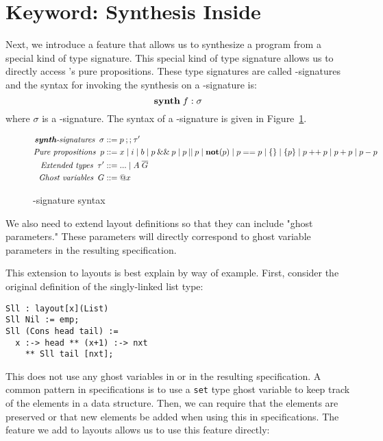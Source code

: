 \section{\synth{} Keyword: Synthesis Inside \Pika}
\label{sec:synth}

Next, we introduce a feature that allows us to synthesize a program from a special kind of \Pika{} type signature. This special kind of type signature allows us to directly access \SuSLik's pure propositions. These type signatures are called \synth-signatures and the syntax for invoking the \Pika{} synthesis on a \synth-signature is:
\[
  \textbf{synth}\; f : \sigma
\]
\noindent
where $\sigma$ is a \synth-signature. The syntax of a \synth-signature is given in Figure~\ref{fig:synth-sig-syntax}.

\begin{figure}
\[
\begin{aligned}
  \textit{\textbf{synth}-signatures}\;\; \sigma &::= p \mathbin{;;} \tau'\\
  \textit{Pure propositions}\;\; p &::= x \mid i \mid b \mid p \mathbin{\&\&} p \mid p \mathbin{||} p
    \mid \textbf{not}(p) \mid p == p \mid \{\} \mid \{p\} \mid p \mathbin{++} p \mid p + p \mid p - p\\
  \textit{Extended types}\;\; \tau' &::= ... \mid A\; \overline{G}\\
  \textit{Ghost variables}\;\; G &::= @x
\end{aligned}
\]
  \caption{\synth-signature syntax}
  \label{fig:synth-sig-syntax}
\end{figure}

\noindent
We also need to extend layout definitions so that they can include "ghost parameters." These parameters will directly correspond to ghost variable parameters in the resulting \SuSLik{} specification.

This extension to layouts is best explain by way of example. First, consider the original definition of the singly-linked list type:

\begin{lstlisting}
Sll : layout[x](List)
Sll Nil := emp;
Sll (Cons head tail) :=
  x :-> head ** (x+1) :-> nxt
    ** Sll tail [nxt];
\end{lstlisting}

\noindent
This does not use any ghost variables in \Pika{} or in the resulting \SuSLik{} specification. A common pattern in \SuSLik{} specifications is to use a \verb|set| type ghost variable to keep track of the elements in a data structure. Then, we can require that the elements are preserved or that new elements be added when using this in specifications. The feature we add to layouts allows us to use this feature directly:

